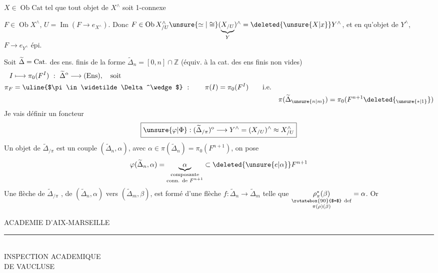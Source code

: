 $X\in\operatorname{Ob}\mathrm{Cat}$ tel que tout objet  de $X^\wedge$ soit 1-connexe

$F\in\operatorname{Ob} X^\wedge$, $U=\operatorname{Im}(F\longrightarrow e_{X^\wedge})$. Donc $F\in\operatorname{Ob}X^\wedge_{/U}\unsure{\simeq|\cong}(\underbrace{X_{/U}}_Y)^\wedge=\deleted{\unsure{X|x}}Y^\wedge$, et en  qu'objet de $Y^\wedge$, $F\longrightarrow e_{Y^\wedge}$ épi.

 Soit $\widetilde\Delta={\rm Cat.}$ des ens. finis de la forme $\widetilde\Delta_n=[0,n]\cap\mathbb Z$ (équiv. à la cat. des ens finis non vides)
\[
\begin{aligned}
 I&\longmapsto\pi_0(F^I)\ :\ \widetilde\Delta^{\mathrm o}\longrightarrow(\mathrm{Ens}),\quad\text{soit}\\
 \pi_F&=\text{\uline{$\pi\in\widetilde\Delta^\wedge$}}\ :\qquad\pi(I)=\pi_0(F^I)\qquad\text{i.e.}\\
 &&\pi(\widetilde\Delta_{\unsure{n|m}})=\pi_0(F^{n+1}\deleted{_{\unsure{*|1}}})
\end{aligned}
\]
Je vais définir un foncteur
\[
 \boxed{\unsure{\varphi|\Phi}:(\widetilde\Delta_{/\pi})^{\mathrm o}\longrightarrow Y^\wedge=(X_{/U})^\wedge\approx X^\wedge_{/U}}
\]
Un objet de $\widetilde\Delta_{/\pi}$ est un couple $(\widetilde\Delta_n,\alpha)$, avec $\alpha\in\pi(\widetilde\Delta_n)=\pi_0(F^{n+1})$, on pose
\[
 \varphi(\widetilde\Delta_n,\alpha)=\underbrace{\alpha}_{\substack{\text{composante}\\\text{conn. de }F^{n+1}}}\subset\deleted{\unsure{e|\alpha}}F^{n+1}
\]
Une flèche de $\widetilde\Delta_{/\pi}$ , de $(\widetilde\Delta_n,\alpha)$ vers $(\widetilde\Delta_m,\beta)$, est formé d'une flèche $f:\widetilde\Delta_n\longrightarrow\widetilde\Delta_m$ telle que $\underset{\substack{\rotatebox{90}{$=$}\ {\rm def}\\\pi(\rho)(\beta)}}{{\rho}_\pi^*(\beta)}=\alpha$. Or

\begin{center}ACADEMIE D'AIX-MARSEILLE\\\rule{4em}{0.4pt}\\
INSPECTION ACADEMIQUE\\DE VAUCLUSE\end{center}

